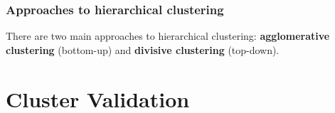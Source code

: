 \documentclass[11pt,fleqn]{book} %
\begin{document}
\subsection*{Approaches to hierarchical clustering}
There are two main approaches to hierarchical clustering: \textbf{agglomerative clustering} (bottom-up) and \textbf{divisive clustering} (top-down). 



\chapter{Cluster Validation}


\cleardoublepage
{}
\setlength{\columnsep}{0.75cm}
\printindex

\end{document}
